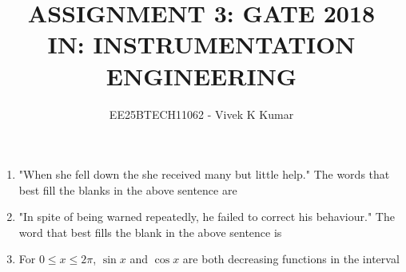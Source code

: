 \documentclass[journal,12pt,onecolumn]{IEEEtran}
\theoremstyle{remark}
\begin{document}
\title{
ASSIGNMENT 3: GATE 2018 \\
IN: INSTRUMENTATION ENGINEERING}
\author{EE25BTECH11062 - Vivek K Kumar}
\maketitle
\renewcommand{\thefigure}{\theenumi}
\renewcommand{\thetable}{\theenumi}

\begin{enumerate}
    \item "When she fell down the \underline{\hspace{2cm}} she received many \underline{\hspace{2cm}} but little help." 
    The words that best fill the blanks in the above sentence are
    
    \hfill{}
    \begin{enumerate}
    \end{enumerate}

    \item "In spite of being warned repeatedly, he failed to correct his \underline{\hspace{2cm}} behaviour."
    The word that best fills the blank in the above sentence is
    
    \hfill{}
    \begin{enumerate}
    \end{enumerate}

    \item For $0 \le x \le 2\pi$, $\sin x$ and $\cos x$ are both decreasing functions in the interval
    
    \hfill{}
    \begin{enumerate}
    \end{enumerate}


\end{enumerate}
\end{document}
